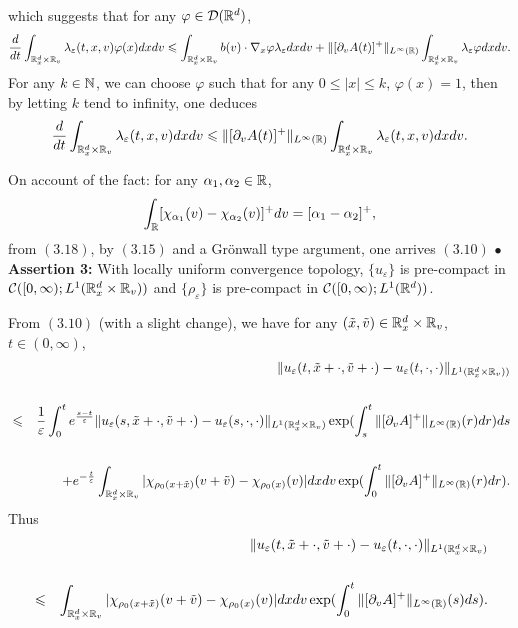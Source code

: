 \documentclass[11pt]{article}
\begin{document}
which suggests that for any $\varphi\in {\mathcal D}({\mathbb R}^d)$,
\begin{eqnarray*}
\frac{d}{dt}\int_{{\mathbb R}^d_x\times{\mathbb R}_v}\lambda_\varepsilon(t,x,v)\varphi(x)dxdv
\leqslant
\int_{{\mathbb R}^d_x\times{\mathbb R}_v}b(v)\cdot\nabla_x\varphi\lambda_\varepsilon
dxdv +
\|[\partial_vA(t)]^+\|_{L^\infty({\mathbb R})}\int_{{\mathbb R}^d_x\times{\mathbb R}_v}
\lambda_\varepsilon\varphi dxdv.
\end{eqnarray*}
For any $k\in {\mathbb N}$, we can choose $\varphi$ such that for any $0\leq
|x|\leq k$, $\varphi(x)=1$, then by letting $k$ tend to infinity,
one deduces
\begin{eqnarray}\label{3.18}
\frac{d}{dt}\int_{{\mathbb R}^d_x\times{\mathbb R}_v}\lambda_\varepsilon(t,x,v)dxdv
\leqslant \|[\partial_vA(t)]^+\|_{L^\infty({\mathbb R})}\int_{{\mathbb R}^d_x\times{\mathbb R}_v}
\lambda_\varepsilon (t,x,v)dxdv.
\end{eqnarray}
   \vskip1mm\par
On account of the fact: for any $\alpha_1,\alpha_2\in
{\mathbb R}$,
\begin{eqnarray}\label{3.19}
\int_{{\mathbb R}}[\chi_{\alpha_1}(v)-\chi_{\alpha_2}(v)]^+dv=[\alpha_1-\alpha_2]^+,
\end{eqnarray}
from $(3.18)$, by $(3.15)$ and a Gr\"{o}nwall type argument, one
arrives $(3.10)$
 \vskip2mm\noindent
$\bullet$ \textbf{Assertion 3:} With locally uniform convergence
topology, $\{u_\varepsilon\}$ is pre-compact in
${\mathcal C}([0,\infty);L^1({\mathbb R}^d_x\times{\mathbb R}_v))$ and $\{\rho_\varepsilon\}$
is pre-compact in ${\mathcal C}([0,\infty);L^1({\mathbb R}^{d}))$.
 \vskip2mm\par
From $(3.10)$ (with a slight change), we have for any
$(\tilde{x},\tilde{v})\in {\mathbb R}^d_x\times{\mathbb R}_v$, $t\in (0,\infty)$,
\begin{eqnarray*}
&&\|u_\varepsilon(t,\tilde{x}+\cdot,\tilde{v}+\cdot)-
u_\varepsilon(t,\cdot,\cdot)\|_{L^1({\mathbb R}^d_x\times {\mathbb R}_v))} \cr\cr
&\leqslant& \frac{1}{\varepsilon}\int^t_0e^{\frac{s-t}
{\varepsilon}}\|u_\varepsilon(s,\tilde{x}+\cdot,\tilde{v}+\cdot)-
u_\varepsilon(s,\cdot,\cdot)\|_{L^1({\mathbb R}^d_x\times {\mathbb R}_v)}
\exp(\int^t_s\|[\partial_vA]^+\|_{L^\infty({\mathbb R})}(r)dr)ds \cr \cr &&
+ e^{-\frac{t}{\varepsilon}}\int_{{\mathbb R}^d_x \times {\mathbb R}_v}
|\chi_{\rho_0(x+\tilde{x})}(v+\tilde{v})-\chi_{\rho_0(x)}(v)|dxdv
\exp(\int^t_0\|[\partial_vA]^+\|_{L^\infty({\mathbb R})}(r)dr).
\end{eqnarray*}
Thus
\begin{eqnarray*}
&&\|u_\varepsilon(t,\tilde{x}+\cdot,\tilde{v}+\cdot)-
u_\varepsilon(t,\cdot,\cdot)\|_{L^1({\mathbb R}^d_x\times {\mathbb R}_v)}
\cr\cr&\leqslant&\int_{{\mathbb R}^d_x \times {\mathbb R}_v}
|\chi_{\rho_0(x+\tilde{x})}(v+\tilde{v})-\chi_{\rho_0(x)}(v)|dxdv\exp(\int^t_0
\|[\partial_vA]^+\|_{L^\infty({\mathbb R})}(s)ds).
\end{eqnarray*}
\end{document}
